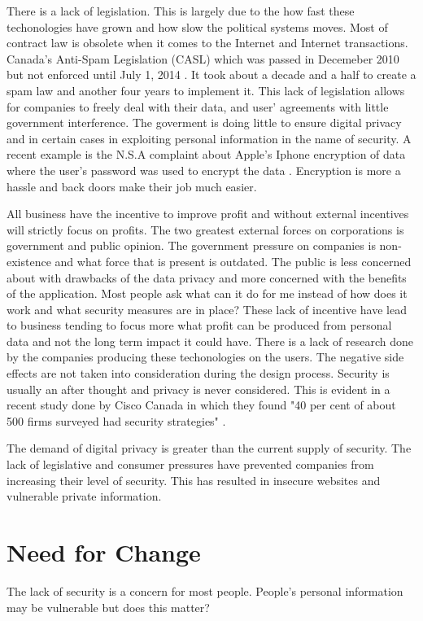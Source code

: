 \documentclass[12pt]{article}
\begin{document}
There is a lack of legislation. This is largely due to the how fast these techonologies have grown and how slow the political systems moves. Most of contract law is obsolete when it comes to the Internet and Internet transactions. Canada’s Anti-Spam Legislation (CASL) which was passed in Decemeber 2010 but not enforced until July 1, 2014 \cite{FastFacts}. It took about a decade and a half to create a spam law and another four years to implement it. This lack of legislation allows for companies to freely deal with their data, and user' agreements with little government interference. The goverment is doing little to ensure digital privacy and in certain cases in exploiting personal information in the name of security. A recent example is the N.S.A complaint about Apple's Iphone encryption of data where the user's password was used to encrypt the data \cite{Schneier}. Encryption is more a hassle and back doors make their job much easier.

All business have the incentive to improve profit and without external incentives will strictly focus on profits. The two greatest external forces on corporations is government and public opinion. The government pressure on companies is non-existence and what force that is present is outdated. The public is less concerned about with drawbacks of the data privacy and more concerned with the benefits of the application. Most people ask what can it do for me instead of how does it work and what security measures are in place? These lack of incentive have lead to business tending to focus more what profit can be produced from personal data and not the long term impact it could have. There is a lack of research done by the companies producing these techonologies on the users. The negative side effects are not taken into consideration during the design process. Security is usually an after thought and privacy is never considered. This is evident in a recent study done by Cisco Canada in which they found "40 per cent of about 500 firms surveyed had security strategies" \cite{Blackwell}.

The demand of digital privacy is greater than the current supply of security. The lack of legislative and consumer pressures have prevented companies from increasing their level of security. This has resulted in insecure websites and vulnerable private information. 

\section{Need for Change}\label{sec:change}
The lack of security is a concern for most people. People's personal information may be vulnerable but does this matter?
\end{document}
